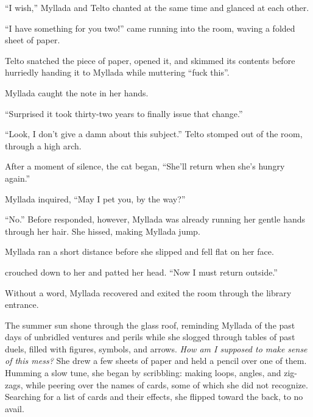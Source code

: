 ``I wish,'' Myllada and Telto chanted at the same time and glanced at each other.

``I have something for you two!'' \yronsyncra{} came running into the room, waving a folded sheet of paper.

Telto snatched the piece of paper, opened it, and skimmed its contents before hurriedly handing it to Myllada while muttering ``fuck this''.

Myllada caught the note in her hands.


``Surprised it took thirty-two years to finally issue that change.''

``Look, I don't give a damn about this subject.'' Telto stomped out of the room, through a high arch.

After a moment of silence, the cat began, ``She'll return when she's hungry again.''

Myllada inquired, ``May I pet you, by the way?''

``No.'' Before \yronsyncra{} responded, however, Myllada was already running her gentle hands through her hair. She hissed, making Myllada jump.

Myllada ran a short distance before she slipped and fell flat on her face.

\yronsyncra{} crouched down to her and patted her head. ``Now I must return outside.''

Without a word, Myllada recovered and exited the room through the library entrance.

\centeredstars

The summer sun shone through the glass roof, reminding Myllada of the past days of unbridled ventures and perils while she slogged through tables of past duels, filled with figures, symbols, and arrows. \emph{How am I supposed to make sense of this mess?} She drew a few sheets of paper and held a pencil over one of them. Humming a slow tune, she began by scribbling: making loops, angles, and zig-zags, while peering over the names of cards, some of which she did not recognize. Searching for a list of cards and their effects, she flipped toward the back, to no avail.


